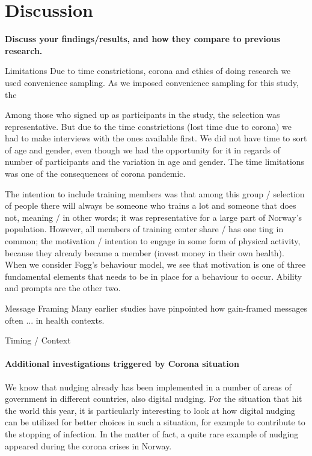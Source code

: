 \chapter{Discussion}

\textbf{Discuss your findings/results, and how they compare to previous research.}

Limitations 
Due to time constrictions, corona and ethics of doing research we used convenience sampling. As we imposed convenience sampling for this study, the 

Among those who signed up as participants in the study, the selection was representative. But due to the time constrictions (lost time due to corona) we had to make interviews with the ones available first. We did not have time to sort of age and gender, even though we had the opportunity for it in regards of number of participants and the variation in age and gender. The time limitations was one of the consequences of corona pandemic. 

The intention to include training members was that among this group / selection of people there will always be someone who trains a lot and someone that does not, meaning / in other words; it was representative for a large part of Norway's population. However, all members of training center share / has one ting in common; the motivation / intention to engage in some form of physical activity, because they already became a member (invest money in their own health). When we consider Fogg's behaviour model, we see that motivation is one of three fundamental elements that needs to be in place for a behaviour to occur. Ability and prompts are the other two. 

Message Framing
Many earlier studies have pinpointed how gain-framed messages often ... in health contexts. 

Timing / Context

\subsubsection{Additional investigations triggered by Corona situation}
We know that nudging already has been implemented in a number of areas of government in different countries, also digital nudging. For the situation that hit the world this year, it is particularly interesting to look at how digital nudging can be utilized for better choices in such a situation, for example to contribute to the stopping of infection. In the matter of fact, a quite rare example of nudging appeared during the corona crises in Norway.  

